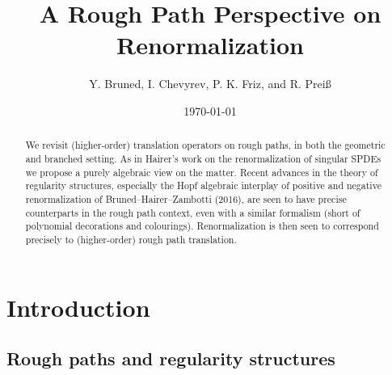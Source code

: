 \documentclass{article}
\begin{document}
\title{A Rough Path Perspective on Renormalization}
\author{Y. Bruned, I. Chevyrev, P. K. Friz, and R. Prei\ss}%


\date{\today}
%
%


\maketitle

\begin{abstract}
We revisit (higher-order) translation operators on rough paths, in both the geometric and branched setting.  As in Hairer's work on the renormalization of
singular SPDEs we propose a purely algebraic view on the matter. Recent advances in the theory of regularity structures, especially the Hopf algebraic 
interplay of positive and negative renormalization of Bruned--Hairer--Zambotti (2016), are seen to have precise counterparts in the rough path context, even with a similar formalism (short of polynomial decorations and colourings). Renormalization is then seen to correspond precisely to (higher-order) rough path translation. 
\end{abstract}

\tableofcontents

\section{Introduction}

\subsection{Rough paths and regularity structures}
\end{document}
